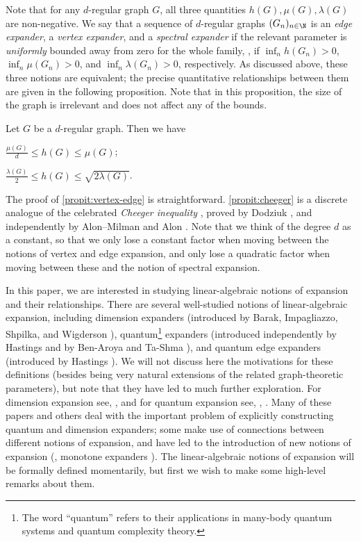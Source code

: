 \documentclass{toc}
\theoremstyle{plain}
\numberwithin{equation}{section}
\theoremstyle{definition}
\begin{document}
Note that for any $d$-regular graph $G$, all three quantities $h(G), \mu(G), \lambda(G)$ are non-negative. We say that a sequence of $d$-regular graphs $(G_n)_{n \in \N}$ is an \emph{edge expander},
%
%
a \emph{vertex expander}, and a \emph{spectral expander} %
if the relevant parameter is \emph{uniformly} bounded away from zero for the whole family,
%
\ie,     %
if
%
%
%
$\inf_n h(G_n)>0$, $\inf_n \mu(G_n)>0$, and $\inf_n \lambda(G_n)>0$, respectively.  %
As discussed above, these three notions are equivalent; the precise quantitative relationships between them are given in the following proposition. Note that in this proposition, the size of the graph is irrelevant and does not affect any of the bounds.
\begin{proposition}\label{prop: graph expansions relations}
Let $G$ be a $d$-regular graph. Then we have
\begin{propenum}
\item $\frac {\mu(G)}d\leq h(G)\leq \mu(G)$;\label{propit:vertex-edge}
\item $\frac{\lambda(G)}{2}\leq h(G)\leq \sqrt{2\lambda(G)}$.\label{propit:cheeger}
\end{propenum}
\end{proposition}
The proof of \cref{propit:vertex-edge} is straightforward. \cref{propit:cheeger} is a discrete analogue of the celebrated
%
%
\emph{Cheeger inequality}   %
\cite{Cheeger70}, proved by Dodziuk \cite{Dod84}, and independently by Alon--Milman \cite{AM85} and Alon \cite{Alo86}. Note that we think of the degree $d$ as a constant, so that we only lose a constant factor when moving between the notions of vertex and edge expansion, and only lose a quadratic factor when moving between these and the notion of spectral expansion.

In this paper, we are interested in studying linear-algebraic notions of expansion and their relationships. There are several well-studied notions of linear-algebraic expansion, including dimension expanders (introduced by Barak, Impagliazzo, Shpilka, and Wigderson \cite{BISW04}), quantum\footnote{The word ``quantum'' refers to their applications in many-body quantum systems and quantum complexity theory.} expanders (introduced independently by Hastings \cite{Has07} and by Ben-Aroya and Ta-Shma \cite{BT07}), and quantum edge expanders (introduced by Hastings \cite{PhysRevA.76.032315}). We will not discuss here the motivations for these definitions (besides being very natural extensions of the related graph-theoretic parameters), but note that they have led to much further exploration. For dimension expansion see, \eg, \cite{DS09,BOURGAIN2009357,Bourgain2013,DW10,FG15,LUBOTZKY2008730} and for quantum expansion see, \eg, \cite{Harrow08,BST10,10.5555/2011781.2011790,zigzag,FM20,KLR21}. Many of these papers and others deal with the important problem of explicitly constructing quantum and dimension expanders; some make use of connections between different notions of expansion, and have led to the introduction of new notions of expansion (\eg, monotone expanders \cite{DS09,Bourgain2013,DW10}). The linear-algebraic notions of expansion will be formally defined momentarily, but first we wish to make some high-level remarks about them. 
\end{document}
